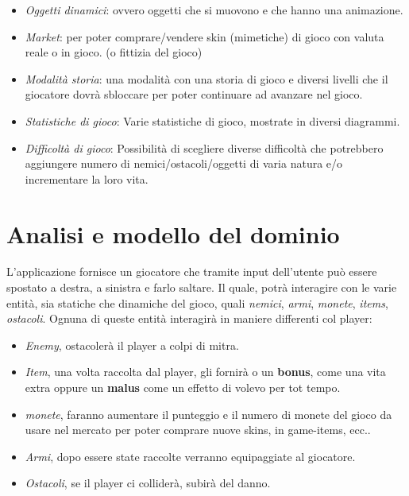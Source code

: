\begin{itemize}
	\item \textsf{\small \emph{Oggetti dinamici}: ovvero oggetti che si muovono e che hanno una animazione.}
	\item \textsf{\small \emph{Market}: per poter comprare/vendere skin (mimetiche) di gioco con valuta reale o in gioco. (o fittizia del gioco)}
	\item \textsf{\small \emph{Modalità storia}: una modalità con una storia di gioco e diversi livelli che il giocatore dovrà sbloccare per poter continuare ad avanzare nel gioco.}
	\item \textsf{\small \emph{Statistiche di gioco}: Varie statistiche di gioco, mostrate in diversi diagrammi.}
	\item \textsf{\small \emph{Difficoltà di gioco}: Possibilità di scegliere diverse difficoltà che potrebbero aggiungere numero di nemici/ostacoli/oggetti di varia natura e/o incrementare la loro vita.}
\end{itemize}

\section{Analisi e modello del dominio}

\textsf{\small L'applicazione fornisce un giocatore che tramite input dell'utente può essere spostato a destra, a sinistra e farlo saltare. Il quale, potrà interagire con le varie entità, sia statiche che dinamiche del gioco, quali \emph{nemici}, \emph{armi}, \emph{monete}, \emph{items}, \emph{ostacoli}.
Ognuna di queste entità interagirà in maniere differenti col player: }\\

\begin{itemize}
	\item \textsf{\small \emph{Enemy}, ostacolerà il player a colpi di mitra.} %
	\item \textsf{\small \emph{Item}, una volta raccolta dal player, gli fornirà o un \textbf{bonus}, come una vita extra oppure un \textbf{malus} come un effetto di volevo per tot tempo.}
	\item \textsf{\small \emph{monete}, faranno aumentare il punteggio e il numero di monete del gioco da usare nel mercato per poter comprare nuove skins, in game-items, ecc..}
	\item \textsf{\small \emph{Armi}, dopo essere state raccolte verranno equipaggiate al giocatore.}
	\item \textsf{\small \emph{Ostacoli}, se il player ci colliderà, subirà del danno.}
\end{itemize}

